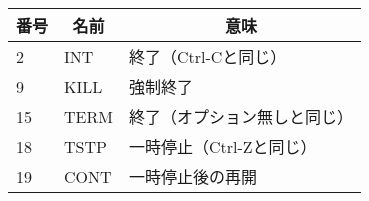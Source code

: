 \documentclass{standalone}
\begin{document}
{\ttfamily
\begin{tabular}{l|l|l}\hline\hline
\multicolumn{1}{c}{番号} &
\multicolumn{1}{|c}{名前} &
\multicolumn{1}{|c}{意味} \\\hline
2  & INT  & 終了（Ctrl-Cと同じ）         \\
9  & KILL & 強制終了                     \\
15 & TERM & 終了（オプション無しと同じ） \\
18 & TSTP & 一時停止（Ctrl-Zと同じ）     \\
19 & CONT & 一時停止後の再開             \\
\end{tabular}}
\end{document}
